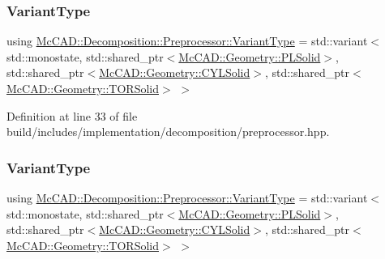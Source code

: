 \subsubsection{\texorpdfstring{Variant\+Type}{VariantType}\hspace{0.1cm}{\footnotesize\ttfamily [1/2]}}
{\footnotesize\ttfamily using \hyperlink{classMcCAD_1_1Decomposition_1_1Preprocessor_a55fe8b69008632be9a000e551c3dfe90}{Mc\+C\+A\+D\+::\+Decomposition\+::\+Preprocessor\+::\+Variant\+Type} =  std\+::variant$<$std\+::monostate, std\+::shared\+\_\+ptr$<$\hyperlink{classMcCAD_1_1Geometry_1_1PLSolid}{Mc\+C\+A\+D\+::\+Geometry\+::\+P\+L\+Solid}$>$, std\+::shared\+\_\+ptr$<$\hyperlink{classMcCAD_1_1Geometry_1_1CYLSolid}{Mc\+C\+A\+D\+::\+Geometry\+::\+C\+Y\+L\+Solid}$>$, std\+::shared\+\_\+ptr$<$\hyperlink{classMcCAD_1_1Geometry_1_1TORSolid}{Mc\+C\+A\+D\+::\+Geometry\+::\+T\+O\+R\+Solid}$>$ $>$\hspace{0.3cm}{\ttfamily [private]}}



Definition at line 33 of file build/includes/implementation/decomposition/preprocessor.\+hpp.

\mbox{\label{classMcCAD_1_1Decomposition_1_1Preprocessor_a55fe8b69008632be9a000e551c3dfe90}} 
\subsubsection{\texorpdfstring{Variant\+Type}{VariantType}\hspace{0.1cm}{\footnotesize\ttfamily [2/2]}}
{\footnotesize\ttfamily using \hyperlink{classMcCAD_1_1Decomposition_1_1Preprocessor_a55fe8b69008632be9a000e551c3dfe90}{Mc\+C\+A\+D\+::\+Decomposition\+::\+Preprocessor\+::\+Variant\+Type} =  std\+::variant$<$std\+::monostate, std\+::shared\+\_\+ptr$<$\hyperlink{classMcCAD_1_1Geometry_1_1PLSolid}{Mc\+C\+A\+D\+::\+Geometry\+::\+P\+L\+Solid}$>$, std\+::shared\+\_\+ptr$<$\hyperlink{classMcCAD_1_1Geometry_1_1CYLSolid}{Mc\+C\+A\+D\+::\+Geometry\+::\+C\+Y\+L\+Solid}$>$, std\+::shared\+\_\+ptr$<$\hyperlink{classMcCAD_1_1Geometry_1_1TORSolid}{Mc\+C\+A\+D\+::\+Geometry\+::\+T\+O\+R\+Solid}$>$ $>$\hspace{0.3cm}{\ttfamily [private]}}



